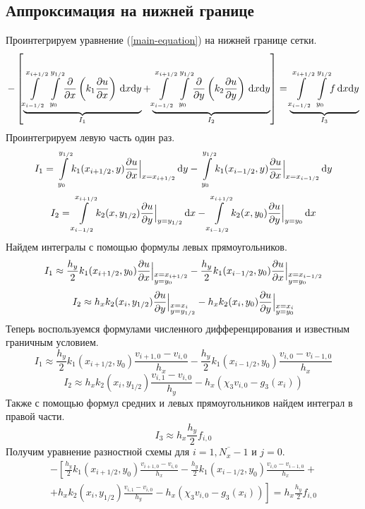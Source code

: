 \subsection{Аппроксимация на нижней границе}
Проинтегрируем уравнение (\ref{main-equation}) на нижней границе сетки.
\[
  - \left[
  \underbrace{ \int\limits_{x_{i-1/2}}^{x_{i+1/2}}\int\limits_{y_{0}}^{y_{1/2}} \! \pdv{x}\left( k_1 \pdv{u}{x} \right) \, \dd x \dd y }_{I_1} +
  \underbrace{ \int\limits_{x_{i-1/2}}^{x_{i+1/2}}\int\limits_{y_{0}}^{y_{1/2}} \! \pdv{y}\left( k_2 \pdv{u}{y} \right) \, \dd x \dd y }_{I_2}
  \right] =
  \underbrace{ \int\limits_{x_{i-1/2}}^{x_{i+1/2}}\int\limits_{y_{0}}^{y_{1/2}} \! f \, \dd x \dd y }_{I_3}
\]
Проинтегрируем левую часть один раз.
\[ I_1 = \int\limits_{y_{0}}^{y_{1/2}} \! k_1(x_{i+1/2},y) \pdv{u}{x} \Big\vert_{x = x_{i+1/2}} \, \dd y - \int\limits_{y_{0}}^{y_{1/2}} \! k_1(x_{i-1/2},y) \pdv{u}{x} \Big\vert_{x = x_{i-1/2}} \, \dd y \]
\[ I_2 = \int\limits_{x_{i-1/2}}^{x_{i+1/2}} \! k_2(x,y_{1/2}) \pdv{u}{y} \Big\vert_{y = y_{1/2}} \, \dd x - \int\limits_{x_{i-1/2}}^{x_{i+1/2}} \! k_2(x,y_{0}) \pdv{u}{y} \Big\vert_{y = y_{0}} \, \dd x \]
Найдем интегралы с помощью формулы левых прямоугольников.
\[ I_1 \approx \frac{h_y}{2} k_1(x_{i+1/2},y_0) \pdv{u}{x} \Big\vert_{\begin{subarray}{l} x = x_{i+1/2} \\ y = y_{0} \end{subarray}} - \frac{h_y}{2} k_1(x_{i-1/2},y_0) \pdv{u}{x} \Big\vert_{\begin{subarray}{l} x = x_{i-1/2} \\ y = y_{0} \end{subarray}} \]
\[ I_2 \approx h_x k_2(x_i,y_{1/2}) \pdv{u}{y} \Big\vert_{\begin{subarray}{l} x = x_{i} \\ y = y_{1/2} \end{subarray}} - h_x k_2(x_i,y_{0}) \pdv{u}{y} \Big\vert_{\begin{subarray}{l} x = x_{i} \\ y = y_{0} \end{subarray}} \]
Теперь воспользуемся формулами численного дифференцирования и известным граничным условием.
\[ I_1 \approx \frac{h_y}{2} k_1(x_{i+1/2},y_0) \frac{v_{i+1,0} - v_{i,0}}{h_x} - \frac{h_y}{2} k_1(x_{i-1/2},y_0) \frac{v_{i,0} - v_{i-1,0}}{h_x} \]
\[ I_2 \approx h_x k_2(x_i,y_{1/2}) \frac{v_{i,1} - v_{i,0}}{h_y} - h_x \left( \chi_3 v_{i,0} - g_3(x_i) \right) \]
Также с помощью формул средних и левых прямоугольников найдем интеграл в правой части.
\[ I_3 \approx h_x \frac{h_y}{2} f_{i,0} \]
Получим уравнение разностной схемы для $i = \overline{1,N_x-1}$ и $j = 0$.
\begin{multline*}
  - \left[
  \frac{h_y}{2} k_1(x_{i+1/2},y_0) \frac{v_{i+1,0} - v_{i,0}}{h_x} - \frac{h_y}{2} k_1(x_{i-1/2},y_0) \frac{v_{i,0} - v_{i-1,0}}{h_x} + \right. \\
  \left. +
  h_x k_2(x_i,y_{1/2}) \frac{v_{i,1} - v_{i,0}}{h_y} - h_x \left( \chi_3 v_{i,0} - g_3(x_i) \right)
  \right] =
  h_x \frac{h_y}{2} f_{i,0}
\end{multline*}

